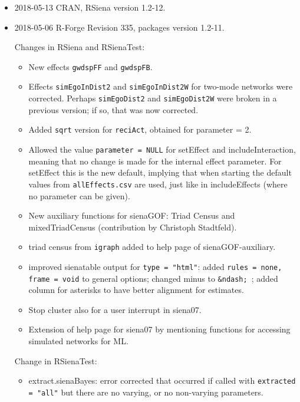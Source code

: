 \documentclass[a4paper,fleqn,11pt]{article}
\newcommand{\+}{\, + \,}
\begin{document}
\begin{small}
\begin{itemize}
\item 2018-05-13 CRAN, \textsf{RSiena} version 1.2-12.

\item 2018-05-06 R-Forge Revision 335, packages version 1.2-11.

Changes in \textsf{RSiena} and \textsf{RSienaTest}:
\begin{itemize}
   \item New effects \texttt{gwdspFF} and \texttt{gwdspFB}.
   \item Effects \texttt{simEgoInDist2} and \texttt{simEgoInDist2W}
   for two-mode networks were corrected.
     Perhaps \texttt{simEgoDist2} and \texttt{simEgoDist2W} were broken
     in a previous version; if so, that was now corrected.
   \item Added \texttt{sqrt} version for \texttt{reciAct}, obtained for parameter = 2.
   \item Allowed the value \texttt{parameter = NULL} for \textsf{setEffect} and
   \textsf{includeInteraction},
     meaning that no change is made for the internal effect parameter.
     For \textsf{setEffect} this is the new default,
     implying that when starting the
     default values from \texttt{allEffects.csv} are used, just like in
     \textsf{includeEffects}
     (where no parameter can be given).
   \item New auxiliary functions for \textsf{sienaGOF}:
   \textsf{Triad Census} and \textsf{mixedTriadCensus}
     (contribution by Christoph Stadtfeld).
   \item triad census from \texttt{igraph} added to help page of
   \textsf{sienaGOF-auxiliary}.
   \item improved \textsf{sienatable} output for \texttt{type = "html"}:
   added \texttt{rules = none, frame = void} to
     general options; changed minus to \texttt{\&ndash;}~;
     added column for asterisks to have better alignment for estimates.
   \item Stop cluster also for a user interrupt in  \textsf{siena07}.
   \item Extension of help page for \textsf{siena07} by
   mentioning functions for accessing simulated networks for ML.
\end{itemize}

Change in \textsf{RSienaTest}:
\begin{itemize}
   \item \textsf{extract.sienaBayes}:
   error corrected that occurred if called with
     \texttt{extracted = "all"} but there are no varying,
     or no non-varying parameters.
\end{itemize}


\end{itemize}
\end{small}
\end{document}
